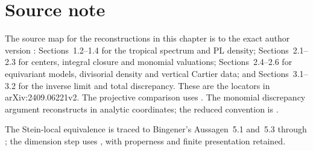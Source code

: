\section*{Source note}
\label{sec:mp-dual-sources}

The source map for the reconstructions in this chapter is to
the exact author version \cite{MPTropicalV2}: Sections~1.2--1.4
for the tropical spectrum and PL density; Sections~2.1--2.3
for centers, integral closure and monomial valuations;
Sections~2.4--2.6 for equivariant models, divisorial density
and vertical Cartier data; and Sections~3.1--3.2 for the
inverse limit and total discrepancy. These are the locators
in arXiv:2409.06221v2. The projective comparison uses
\cite[Theorem~A.1 and Lemma~A.2, p.~828]{BJ22}.
The monomial discrepancy argument reconstructs
\cite[Lemma~1.5 and Proposition~5.1]{JM12} in analytic
coordinates; the reduced convention is
\cite[Definition~2.4.1]{MPWN25}.

The Stein-local equivalence is traced to Bingener's
Aussagen~5.1 and~5.3 through
\cite[Theorem~5.4.4 and Corollaries~5.4.12--5.4.14]{XiaStein26};
the dimension step uses \cite[Aussage~2.8]{Bingener76Stein},
with properness and finite presentation retained.
